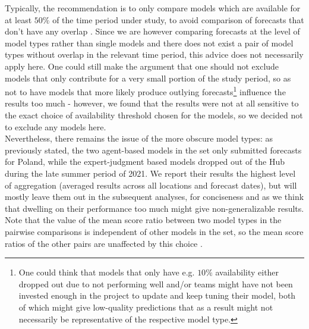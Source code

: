 Typically, the recommendation is to only compare models which are available for at least $50\% $ of the time period under study, to avoid comparison of forecasts that don't have any overlap \citep{bosse_epiforecastsscoringutils_2022}. Since we are however comparing forecasts at the level of model types rather than single models and there does not exist a pair of model types without overlap in the relevant time period, this advice does not necessarily apply here. One could still make the argument that one should not exclude models that only contribute for a very small portion of the study period, so as not to have models that more likely produce outlying forecasts\footnote{One could think that models that only have e.g. $10\%$ availability either dropped out due to not performing well and/or teams might have not been invested enough in the project to update and keep tuning their model, both of which might give low-quality predictions that as a result might not necessarily be representative of the respective model type.} influence the results too much - however, we found that the results were not at all sensitive to the exact choice of availability threshold chosen for the models, so we decided not to exclude any models here.\\ 
Nevertheless, there remains the issue of the more obscure model types: as previously stated, the two agent-based models in the set only submitted forecasts for Poland, while the expert-judgment based models dropped out of the Hub during the late summer period of 2021. We report their results the highest level of aggregation (averaged results across all locations and forecast dates), but will mostly leave them out in the subsequent analyses, for conciseness and as we think that dwelling on their performance too much might give non-generalizable results. Note that the value of the mean score ratio between two model types in the pairwise comparisons is independent of other models in the set, so the mean score ratios of the other pairs are unaffected by this choice .\\
